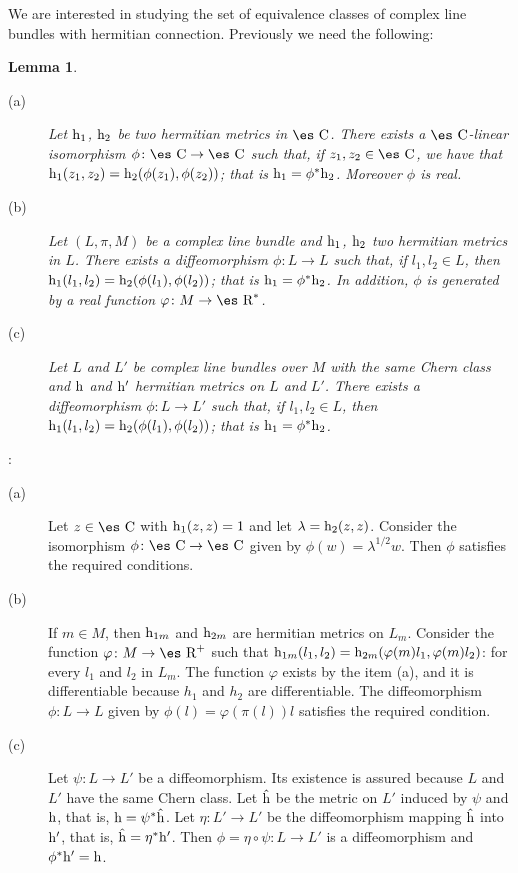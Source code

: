 \documentclass[12pt]{article}
\theoremstyle{plain}
\newtheorem{lem}{Lemma}
\def\qed{\ifvmode\removelastskip\fi
{\unskip\nobreak\hfil\penalty50\hbox{}\nobreak\hfil
\hbox{\vrule height1.2ex width1.2ex}\parfillskip=0pt
\finalhyphendemerits=0 \par\smallskip}}
\def\h{{\rm h}}
\def\Real{\mbox{\es R}}
\def\Complex{\mbox{\es C}}
\begin{document}
We are interested in studying the set of
equivalence classes of complex line bundles with hermitian connection.
Previously we need the following:

\begin{lem}
\begin{description}
\item[{\rm (a)}]
Let $\h_1$, $\h_2$ be
two hermitian metrics in $\Complex$.
There exists a $\Complex$-linear isomorphism
$\phi \colon \Complex \to \Complex$
such that, if $z_1,z_2 \in \Complex$,
we have that $\h_1(z_1,z_2) = \h_2(\phi (z_1),\phi (z_2))$;
that is $\h_1 = \phi^*\h_2$.
Moreover $\phi$ is real.
\item[{\rm (b)}]
Let $(L,\pi ,M)$ be a complex line bundle
and $\h_1$, $\h_2$
two hermitian metrics in $L$.
There exists a diffeomorphism
$\phi \colon L \to L$
such that, if $l_1,l_2 \in L$,
then $\h_1(l_1,l_2) = \h_2(\phi (l_1),\phi (l_2))$;
that is $\h_1 = \phi^*\h_2$.
In addition, $\phi$ is generated by a real function
$\varphi \colon M \to \Real^*$.
\item[{\rm (c)}]
Let $L$ and $L'$ be complex line bundles over $M$
with the same Chern class and $\h$ and $\h '$
hermitian metrics on $L$ and $L'$.
There exists a diffeomorphism $\phi \colon L \to L'$
such that, if $l_1,l_2 \in L$,
then $\h_1(l_1,l_2) = \h_2(\phi (l_1),\phi (l_2))$;
that is $\h_1 = \phi^*\h_2$.
\end{description}
\end{lem}
: 
\begin{description}
\item[{\rm (a)}]
Let $z \in \Complex$ with $\h_1(z,z)=1$
and let $\lambda = \h_2(z,z)$.
Consider the isomorphism $\phi \colon \Complex \to \Complex$
given by $\phi (w) = \lambda^{1/2}w$.
Then $\phi$ satisfies the required conditions.
\item[{\rm (b)}]
If $m \in M$, then $\h_{1m}$ and $\h_{2m}$
are hermitian metrics on $L_m$.
Consider the function $\varphi \colon M \to \Real^+$ such that
$\h_{1m}(l_1,l_2) = \h_{2m}(\varphi (m)l_1,\varphi (m)l_2)$:
for every $l_1$ and $l_2$ in $L_m$. The function $\varphi$ exists
by the item (a), and it is differentiable because $h_1$ and $h_2$ are
differentiable.
The diffeomorphism $\phi \colon L \to L$ given by
$\phi (l) = \varphi (\pi (l))l$ satisfies the required condition.
\item[{\rm (c)}]
Let $\psi \colon L \to L'$ be a diffeomorphism.
Its existence is assured because $L$ and $L'$
have the same Chern class.
Let $\hat \h$ be the metric on $L'$ induced by $\psi$ and $\h$,
that is, $\h = \psi^* \hat \h$.
Let $\eta \colon L' \to L'$ be the diffeomorphism
mapping $\hat \h$ into $\h '$, that is,
$\hat \h = \eta ^* \h '$.
Then $\phi = \eta \circ \psi \colon L \to L'$
is a diffeomorphism and $\phi^* \h ' = \h$.
\end{description}
\qed
\end{document}
